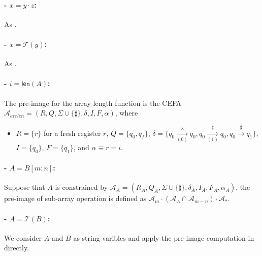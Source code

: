 \documentclass[12pt]{article}
\newcommand*{\aut}{\mathcal{A}}
\newcommand*{\transducer}{\mathcal{T}}
\newcommand{\arrseparator}{\sharp}
\newcommand{\mylen}{\mathsf{len}}
\newcommand{\myset}[1]{\{#1\}}
\theoremstyle{remark}
\begin{document}
\paragraph{- $x = y\cdot z$:} As \cite{ostrich}.

\paragraph{- $x = \transducer(y)$:} As \cite{ostrich}.

\paragraph{- $i = \mylen(A)$:} The pre-image for the array length function is the CEFA $\aut_{arrlen}=(R, Q, \Sigma\cup\{\arrseparator\}, \delta, I, F, \alpha)$, where
\begin{itemize}
    \item $R = \{r\}$ for a fresh register $r$, $Q = \{q_0, q_f\}$, $\delta = \myset{q_0\xrightarrow[(0)]{\Sigma}q_0, q_0\xrightarrow[(1)]{\sharp}q_0,  q_0\xrightarrow{\sharp}q_1} $, $I = \myset{q_0}$, $F = \myset{q_1}$, and $\alpha \equiv r = i$.
\end{itemize}

\paragraph{- $A = B[m:n]$:} Suppose that $A$ is constrained by $\aut_A=(R_A, Q_A, \Sigma\cup\{\arrseparator\}, \delta_A, I_A, F_A, \alpha_A)$, the pre-image of sub-array operation is defined as $\aut_m\cdot (\aut_A\cap \aut_{m-n})\cdot \aut_{*}$.

\paragraph{- $A = \transducer(B)$:} We consider $A$ and $B$ as string varibles and apply the pre-image computation in \cite{ostrich} directly.
\end{document}
